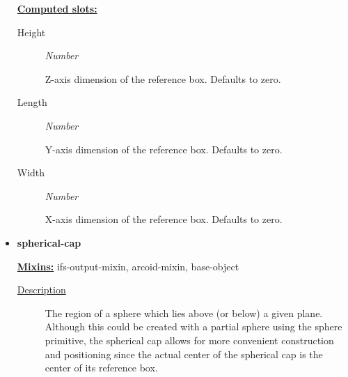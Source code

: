 \documentclass [11pt]{book}
\begin{document}
\begin{itemize}
\textbf{
\underline{Computed slots:}}

\begin{description}

\item [Height]
\emph{Number}

 Z-axis dimension of the reference box. Defaults to zero.




\item [Length]
\emph{Number}

 Y-axis dimension of the reference box. Defaults to zero.




\item [Width]
\emph{Number}

 X-axis dimension of the reference box. Defaults to zero.




\end{description}







\item {}
\label{prim:spherical-cap}
\textbf{spherical-cap}


\textbf{
\underline{Mixins:}} ifs-output-mixin, arcoid-mixin, base-object





\begin{description}

\item [
\underline{Description}]


The region of a sphere which lies above (or below) a given plane. Although this
could be created with a partial sphere using the sphere primitive, the spherical cap allows for more convenient
construction and positioning since the actual center of the spherical cap is the center of its reference box.



\end{description}




\begin{figure}
\begin{lrbox}{\boxedverb}
\begin{minipage}{\linewidth}
{\small

\begin{verbatim}
  

\end{verbatim}}
\end{minipage}
\end{lrbox}
\end{figure}
\end{itemize}
\end{document}
